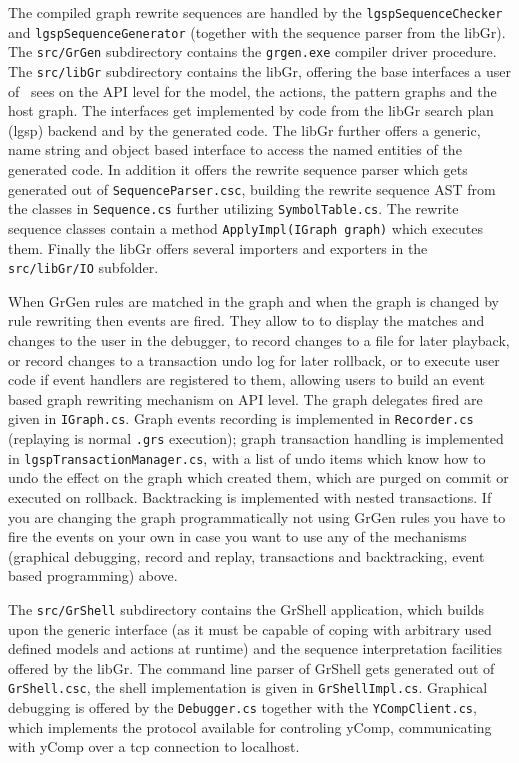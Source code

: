 The compiled graph rewrite sequences are handled by the \texttt{lgsp\-Sequence\-Checker} and \texttt{lgsp\-Sequence\-Generator} (together with the sequence parser from the libGr).
The \texttt{src/GrGen} subdirectory contains the \texttt{grgen.exe} compiler driver procedure.
The \texttt{src/libGr} subdirectory contains the libGr, offering the base interfaces a user of \GrG~sees on the API level for the model, the actions, the pattern graphs and the host graph.
The interfaces get implemented by code from the libGr search plan (lgsp) backend and by the generated code.
The libGr further offers a generic, name string and object based interface to access the named entities of the generated code.
In addition it offers the rewrite sequence parser which gets generated out of \texttt{SequenceParser.csc},
building the rewrite sequence AST from the classes in \texttt{Sequence.cs} further utilizing \texttt{SymbolTable.cs}.
The rewrite sequence classes contain a method \texttt{ApplyImpl(IGraph graph)} which executes them.
Finally the libGr offers several importers and exporters in the \texttt{src/libGr/IO} subfolder.

When GrGen rules are matched in the graph and when the graph is changed by rule rewriting then events are fired.
They allow to to display the matches and changes to the user in the debugger,
to record changes to a file for later playback, or record changes to a transaction undo log for later rollback, 
or to execute user code if event handlers are registered to them,
allowing users to build an event based graph rewriting mechanism on API level.
The graph delegates fired are given in \texttt{IGraph.cs}.
Graph events recording is implemented in \texttt{Recorder.cs} (replaying is normal \texttt{.grs} execution);
graph transaction handling is implemented in \texttt{lgspTransactionManager.cs}, with a list of undo items which know how to undo the effect on the graph which created them, which are purged on commit or executed on rollback.
Backtracking is implemented with nested transactions.
If you are changing the graph programmatically not using GrGen rules you have to fire the events on your own in case you want to use any of the mechanisms (graphical debugging, record and replay, transactions and backtracking, event based programming) above.

The \texttt{src/GrShell} subdirectory contains the GrShell application, which builds upon the generic interface (as it must be capable of coping with arbitrary used defined models and actions at runtime) and the sequence interpretation facilities offered by the libGr.
The command line parser of GrShell gets generated out of \texttt{GrShell.csc}, the shell implementation is given in \texttt{GrShellImpl.cs}.
Graphical debugging is offered by the \texttt{Debugger.cs} together with the \texttt{YCompClient.cs}, which implements the protocol available for controling yComp, communicating with yComp over a tcp connection to localhost.

